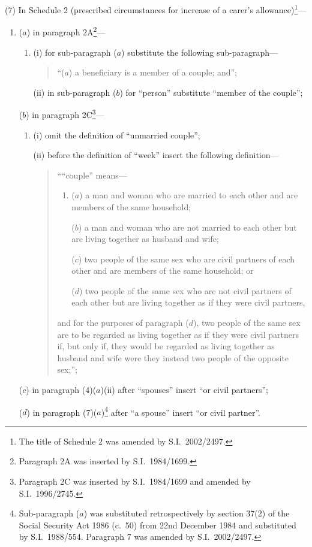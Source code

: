 \documentclass[12pt,a4paper]{article}
\begin{document}
\begin{sloppypar}
(7) In Schedule 2 (prescribed circumstances for increase of a carer’s allowance)\footnote{The title of Schedule 2 was amended by S.I.\ 2002/2497.}—
\end{sloppypar}
\begin{enumerate}\item[]
($a$) in paragraph 2A\footnote{Paragraph 2A was inserted by S.I.\ 1984/1699.}—
\begin{enumerate}\item[]
(i) for sub-paragraph ($a$)  substitute the following sub-paragraph—
\begin{quotation}
“($a$) a beneficiary is a member of a couple; and”;
\end{quotation}

(ii) in sub-paragraph ($b$)  for “person” substitute “member of the couple”;
\end{enumerate}

($b$) in paragraph 2C\footnote{Paragraph 2C was inserted by S.I.\ 1984/1699 and amended by S.I.\ 1996/2745.}—
\begin{enumerate}\item[]
(i) omit the definition of “unmarried couple”;

(ii) before the definition of “week” insert the following definition—
\begin{quotation}
““couple” means—
\begin{enumerate}\item[]
($a$) 
a man and woman who are married to each other and are members of the same household;

($b$) 
a man and woman who are not married to each other but are living together as husband and wife;

($c$) 
two people of the same sex who are civil partners of each other and are members of the same household; or

($d$) 
two people of the same sex who are not civil partners of each other but are living together as if they were civil partners,
\end{enumerate}
and for the purposes of paragraph ($d$), two people of the same sex are to be regarded as living together as if they were civil partners if, but only if, they would be regarded as living together as husband and wife were they instead two people of the opposite sex;”;
\end{quotation}
\end{enumerate}

($c$) in paragraph (4)($a$)(ii)  after “spouses” insert “or civil partners”;

($d$) in paragraph (7)($a$)\footnote{Sub-paragraph ($a$) was substituted retrospectively by section 37(2) of the Social Security Act 1986 (c.\ 50) from 22nd December 1984 and substituted by S.I.\ 1988/554. Paragraph 7 was amended by S.I.\ 2002/2497.} after “a spouse” insert “or civil partner”.
\end{enumerate}
\end{document}
